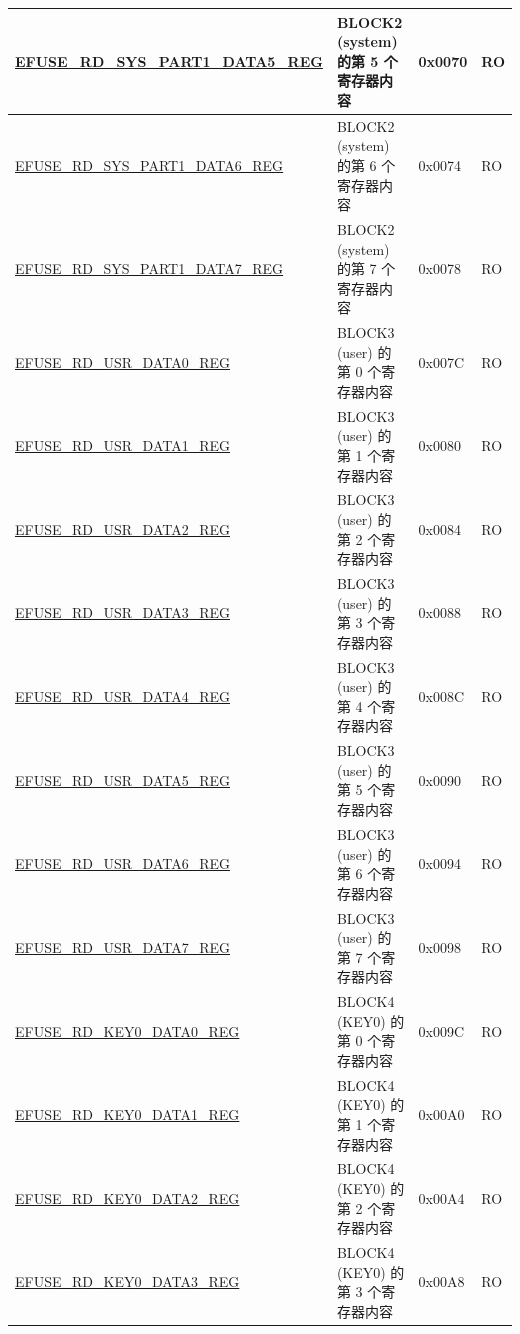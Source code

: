 \begin{longtable}{ | p{6.8cm} | p{7cm} | p{1.3cm} | p{1.2cm} | }
    \hyperref[regdesc:EFUSERDSYSPART1DATA4TO7REG]{EFUSE\_RD\_SYS\_PART1\_DATA5\_REG} & BLOCK2 (system) 的第 5 个寄存器内容 & 0x0070 & RO \\ \hline
    \hyperref[regdesc:EFUSERDSYSPART1DATA4TO7REG]{EFUSE\_RD\_SYS\_PART1\_DATA6\_REG} & BLOCK2 (system) 的第 6 个寄存器内容 & 0x0074 & RO \\ \hline
    \hyperref[regdesc:EFUSERDSYSPART1DATA4TO7REG]{EFUSE\_RD\_SYS\_PART1\_DATA7\_REG} & BLOCK2 (system) 的第 7 个寄存器内容 & 0x0078 & RO \\ \hline
    \hyperref[regdesc:EFUSERDUSRDATANREG]{EFUSE\_RD\_USR\_DATA0\_REG} & BLOCK3 (user) 的第 0 个寄存器内容 & 0x007C & RO \\ \hline
    \hyperref[regdesc:EFUSERDUSRDATANREG]{EFUSE\_RD\_USR\_DATA1\_REG} & BLOCK3 (user) 的第 1 个寄存器内容 & 0x0080 & RO \\ \hline
    \hyperref[regdesc:EFUSERDUSRDATANREG]{EFUSE\_RD\_USR\_DATA2\_REG} & BLOCK3 (user) 的第 2 个寄存器内容 & 0x0084 & RO \\ \hline
    \hyperref[regdesc:EFUSERDUSRDATANREG]{EFUSE\_RD\_USR\_DATA3\_REG} & BLOCK3 (user) 的第 3 个寄存器内容 & 0x0088 & RO \\ \hline
    \hyperref[regdesc:EFUSERDUSRDATANREG]{EFUSE\_RD\_USR\_DATA4\_REG} & BLOCK3 (user) 的第 4 个寄存器内容 & 0x008C & RO \\ \hline
    \hyperref[regdesc:EFUSERDUSRDATANREG]{EFUSE\_RD\_USR\_DATA5\_REG} & BLOCK3 (user) 的第 5 个寄存器内容 & 0x0090 & RO \\ \hline
    \hyperref[regdesc:EFUSERDUSRDATANREG]{EFUSE\_RD\_USR\_DATA6\_REG} & BLOCK3 (user) 的第 6 个寄存器内容 & 0x0094 & RO \\ \hline
    \hyperref[regdesc:EFUSERDUSRDATANREG]{EFUSE\_RD\_USR\_DATA7\_REG} & BLOCK3 (user) 的第 7 个寄存器内容 & 0x0098 & RO \\ \hline
    \hyperref[regdesc:EFUSERDKEY0DATANREG]{EFUSE\_RD\_KEY0\_DATA0\_REG} & BLOCK4 (KEY0) 的第 0 个寄存器内容 & 0x009C & RO \\ \hline
    \hyperref[regdesc:EFUSERDKEY0DATANREG]{EFUSE\_RD\_KEY0\_DATA1\_REG} & BLOCK4 (KEY0) 的第 1 个寄存器内容 & 0x00A0 & RO \\ \hline
    \hyperref[regdesc:EFUSERDKEY0DATANREG]{EFUSE\_RD\_KEY0\_DATA2\_REG} & BLOCK4 (KEY0) 的第 2 个寄存器内容 & 0x00A4 & RO \\ \hline
    \hyperref[regdesc:EFUSERDKEY0DATANREG]{EFUSE\_RD\_KEY0\_DATA3\_REG} & BLOCK4 (KEY0) 的第 3 个寄存器内容 & 0x00A8 & RO \\ \hline

\end{longtable}
